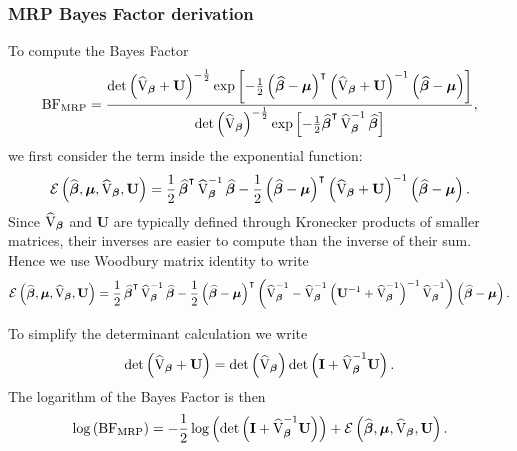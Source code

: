 \subsubsection*{MRP Bayes Factor derivation} \label{app1}
To compute the Bayes Factor 
$$\textrm{BF}_{\textrm{MRP}} = \frac{\det\left(\widehat{\mathbf{\textrm{V}}}_{{\boldsymbol {\beta}}} + \mathbf{U} \right)^{-\frac{1}{2}}
\exp\left[-\frac{1}{2}\left({\boldsymbol {\widehat{\beta}} - {\boldsymbol \mu}}\right)^{\intercal}\left(\widehat{\mathbf{\textrm{V}}}_{{\boldsymbol {\beta}}} + \mathbf{U}\right)^{-1}\left({\boldsymbol {\widehat{\beta}}} - {\boldsymbol \mu}\right)\right]}
{\det \left( \widehat{\mathbf{\textrm{V}}}_{\boldsymbol {\beta}}\right)^{-\frac{1}{2}}\exp \left[-\frac{1}{2}{\boldsymbol {\widehat{\beta}}}^{\intercal}\, \widehat{\mathbf{\textrm{V}}}_{\boldsymbol {\beta}}^{-1} 
\,{\boldsymbol {\widehat{\beta}}}\right]},$$
we first consider the term inside the exponential function:
$$ \mathcal{E} \left(\widehat{\boldsymbol \beta}, \boldsymbol \mu, \widehat{\mathbf{\textrm{V}}}_{\boldsymbol {\beta}}, \mathbf{U}\right) = 
\frac{1}{2}\, {\boldsymbol {\widehat{\beta}}}^{\intercal}\, \widehat{\mathbf{\textrm{V}}}_{\boldsymbol {\beta}}^{-1} \,{\boldsymbol {\widehat{\beta}}}
-\frac{1}{2}\left({\boldsymbol {\widehat{\beta}} - {\boldsymbol \mu}}\right)^{\intercal}\left(\widehat{\mathbf{\textrm{V}}}_{{\boldsymbol {\beta}}} + \mathbf{U}\right)^{-1}\left({\boldsymbol {\widehat{\beta}}} - {\boldsymbol \mu}\right).
$$
Since $\widehat{\mathbf{\textrm{V}}}_{\boldsymbol {\beta}}$ and $\mathbf{U}$ are typically defined through Kronecker products of smaller matrices, their inverses
are easier to compute than the inverse of their sum. Hence we use Woodbury matrix identity to write
$$ 
\mathcal{E} \left(\widehat{\boldsymbol \beta}, \boldsymbol \mu, \widehat{\mathbf{\textrm{V}}}_{\boldsymbol {\beta}}, \mathbf{U}\right) = 
\frac{1}{2}\, {\boldsymbol {\widehat{\beta}}}^{\intercal}\, \widehat{\mathbf{\textrm{V}}}_{\boldsymbol {\beta}}^{-1} \,{\boldsymbol {\widehat{\beta}}}
-\frac{1}{2}\left({\boldsymbol {\widehat{\beta}} - {\boldsymbol \mu}}\right)^{\intercal} \left( \widehat{\mathbf{\textrm{V}}}_{\boldsymbol {\beta}}^{-1} - \widehat{\mathbf{\textrm{V}}}_{\boldsymbol {\beta}}^{-1} 
\left(\mathbf{U}^{-1} + \widehat{\mathbf{\textrm{V}}}_{\boldsymbol {\beta}}^{-1} \right)^{-1} \widehat{\mathbf{\textrm{V}}}_{\boldsymbol {\beta}}^{-1} \right ) 
\left({\boldsymbol {\widehat{\beta}} - {\boldsymbol \mu}}\right).
$$

To simplify the determinant calculation we write 
$$\det\left( \widehat{\mathbf{\textrm{V}}}_{{\boldsymbol {\beta}}} + \mathbf{U} \right) = \det\left( \widehat{\mathbf{\textrm{V}}}_{{\boldsymbol {\beta}}}\right) \det\left( \mathbf{I} + \widehat{\mathbf{\textrm{V}}}_{{\boldsymbol {\beta}}}^{-1} \mathbf{U}\right).$$
The logarithm of the Bayes Factor is then
$$\log \left( \textrm{BF}_{\textrm{MRP}} \right) = 
-\frac{1}{2} \log \left( \det\left( \mathbf{I} + \widehat{\mathbf{\textrm{V}}}_{{\boldsymbol {\beta}}}^{-1} \mathbf{U} \right) \right)  + \mathcal{E} \left(\widehat{\boldsymbol \beta}, \boldsymbol \mu, \widehat{\mathbf{\textrm{V}}}_{\boldsymbol {\beta}}, \mathbf{U}\right).$$



